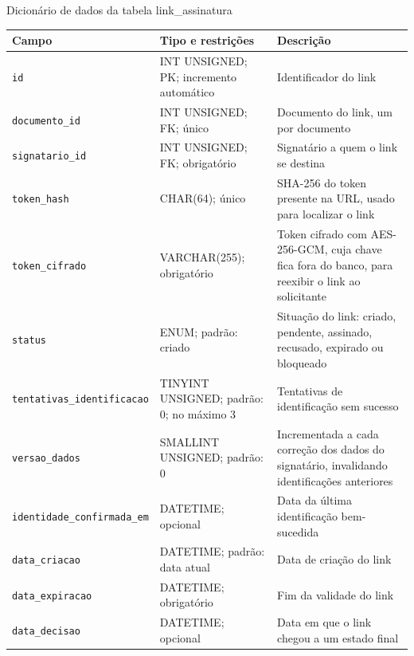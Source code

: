 \documentclass[
    12pt,
    a4paper,
    oneside,
    chapter=TITLE,
    section=TITLE,
    subsection=TITLE,
    subsubsection=TITLE,
    sumario=tradicional,
    english,
    brazil
]{abntex2}
\newcommand{\elem}[1]{\texttt{#1}}
\begin{document}
\begin{quadro}[H]
    \caption{Dicionário de dados da tabela link\_assinatura}
    \label{quadro:dic-link}
    \centering
    \footnotesize
    \begin{tabular}{L{4.5cm}L{3.6cm}L{6.3cm}}
        \toprule
        \textbf{Campo} & \textbf{Tipo e restrições} & \textbf{Descrição} \\
        \midrule
        \elem{id} & INT UNSIGNED; PK; incremento automático & Identificador do link \\
        \elem{documento\_id} & INT UNSIGNED; FK; único & Documento do link, um por documento \\
        \elem{signatario\_id} & INT UNSIGNED; FK; obrigatório & Signatário a quem o link se destina \\
        \elem{token\_hash} & CHAR(64); único & SHA-256 do token presente na URL, usado para localizar o link \\
        \elem{token\_cifrado} & VARCHAR(255); obrigatório & Token cifrado com AES-256-GCM, cuja chave fica fora do banco, para reexibir o link ao solicitante \\
        \elem{status} & ENUM; padrão: criado & Situação do link: criado, pendente, assinado, recusado, expirado ou bloqueado \\
        \elem{tentativas\_identificacao} & TINYINT UNSIGNED; padrão: 0; no máximo 3 & Tentativas de identificação sem sucesso \\
        \elem{versao\_dados} & SMALLINT UNSIGNED; padrão: 0 & Incrementada a cada correção dos dados do signatário, invalidando identificações anteriores \\
        \elem{identidade\_confirmada\_em} & DATETIME; opcional & Data da última identificação bem-sucedida \\
        \elem{data\_criacao} & DATETIME; padrão: data atual & Data de criação do link \\
        \elem{data\_expiracao} & DATETIME; obrigatório & Fim da validade do link \\
        \elem{data\_decisao} & DATETIME; opcional & Data em que o link chegou a um estado final \\
        \bottomrule
    \end{tabular}
\end{quadro}
\end{document}
